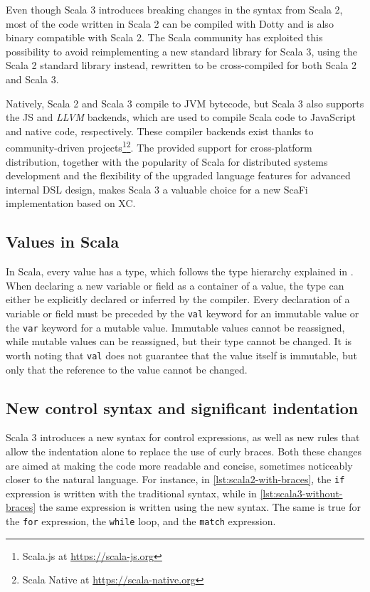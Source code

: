 Even though Scala 3 introduces breaking changes in the syntax from Scala 2, most of the code written in Scala 2 can be compiled with Dotty and is also binary compatible with Scala 2.
%
The Scala community has exploited this possibility to avoid reimplementing a new standard library for Scala 3, using the Scala 2 standard library instead, rewritten to be cross-compiled for both Scala 2 and Scala 3.

Natively, Scala 2 and Scala 3 compile to \ac{JVM} bytecode, but Scala 3 also supports the \ac{JS} and \textit{LLVM} backends, which are used to compile Scala code to JavaScript and native code, respectively.
%
These compiler backends exist thanks to community-driven projects\footnote{Scala.js at \url{https://scala-js.org}}\footnote{Scala Native at \url{https://scala-native.org}}\cite{scala-js}.
%
The provided support for cross-platform distribution, together with the popularity of Scala for distributed systems development\cite{scala-popularity} and the flexibility of the upgraded language features for advanced internal \ac{DSL} design, makes Scala 3 a valuable choice for a new ScaFi implementation based on \ac{XC}.

\subsection{Values in Scala}

In Scala, every value has a type, which follows the type hierarchy explained in .
%
When declaring a new variable or field as a container of a value, the type can either be explicitly declared or inferred by the compiler.
%
Every declaration of a variable or field must be preceded by the \texttt{val} keyword for an immutable value or the \texttt{var} keyword for a mutable value.
%
Immutable values cannot be reassigned, while mutable values can be reassigned, but their type cannot be changed.
%
It is worth noting that \texttt{val} does not guarantee that the value itself is immutable, but only that the reference to the value cannot be changed.


\subsection{New control syntax and significant indentation}

Scala 3 introduces a new syntax for control expressions, as well as new rules that allow the indentation alone to replace the use of curly braces.
%
Both these changes are aimed at making the code more readable and concise, sometimes noticeably closer to the natural language.
%
For instance, in \cref{lst:scala2-with-braces}, the \texttt{if} expression is written with the traditional syntax, while in \cref{lst:scala3-without-braces} the same expression is written using the new syntax.
%
The same is true for the \texttt{for} expression, the \texttt{while} loop, and the \texttt{match} expression.


